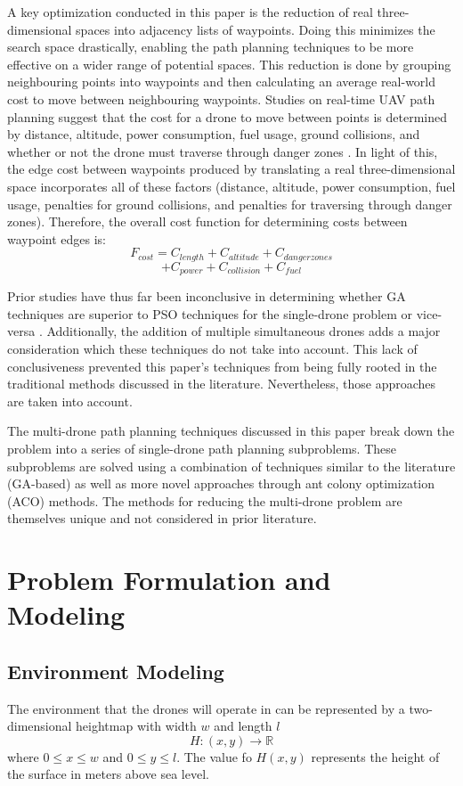 \documentclass[conference]{IEEEtran}
\begin{document}
A key optimization conducted in this paper is the reduction of real three-dimensional spaces into adjacency lists of waypoints. Doing this minimizes the search space drastically, enabling the path planning techniques to be more effective on a wider range of potential spaces. This reduction is done by grouping neighbouring points into waypoints and then calculating an average real-world cost to move between neighbouring waypoints. Studies on real-time UAV path planning suggest that the cost for a drone to move between points is determined by distance, altitude, power consumption, fuel usage, ground collisions, and whether or not the drone must traverse through danger zones \cite{b1}. In light of this, the edge cost between waypoints produced by translating a real three-dimensional space incorporates
all of these factors (distance, altitude, power consumption, fuel usage, penalties for ground collisions, and penalties for traversing through danger zones). Therefore, the overall cost function for determining costs between waypoint edges is:
$$F_{cost} = C_{length} + C_{altitude} + C_{danger zones}$$
$$ + C_{power} + C_{collision} + C_{fuel}$$

Prior studies have thus far been inconclusive in determining whether GA techniques are superior to PSO techniques for the single-drone problem \cite{b2} or vice-versa \cite{b3}. Additionally, the addition of multiple simultaneous drones adds a major consideration which these techniques do not take into account. This lack of conclusiveness prevented this paper's techniques from being fully rooted in the traditional methods discussed in the literature. Nevertheless, those approaches are taken into account.

The multi-drone path planning techniques discussed in this paper break down the problem into a series of single-drone path planning subproblems. These subproblems are solved using a combination of techniques similar to the literature (GA-based) as well as more novel approaches through ant colony optimization (ACO) methods. The methods for reducing the multi-drone problem are themselves unique and not considered in prior literature.

\section{Problem Formulation and Modeling}

\subsection{Environment Modeling}
The environment that the drones will operate in can be represented by a two-dimensional heightmap with width $w$ and length $l$
$$H : (x, y) \rightarrow \mathbb{R}$$
where $0 \leq x \leq w$ and $0 \leq y \leq l$. The value fo $H(x, y)$ represents the height of the surface in meters above sea level.
\end{document}
